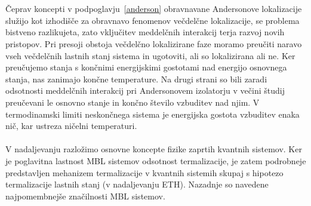 \\\\ 
Čeprav koncepti v podpoglavju~\ref{anderson} obravnavane Andersonove lokalizacije služijo kot izhodišče za obravnavo fenomenov večdelčne lokalizacije, se problema bistveno razlikujeta, zato vključitev meddelčnih interakcij terja razvoj novih pristopov.
 Pri presoji obstoja večdelčno lokalizirane faze moramo preučiti naravo vseh večdelčnih lastnih stanj sistema in ugotoviti, ali so lokalizirana ali ne. Ker preučujemo stanja s končnimi energijskimi gostotami nad energijo osnovnega stanja, nas zanimajo končne temperature. Na drugi strani so bili zaradi odsotnosti meddelčnih interakcij pri Andersonovem izolatorju v večini študij preučevani le osnovno stanje in končno število vzbuditev nad njim. V termodinamski limiti neskončnega sistema je energijska gostota vzbuditev enaka nič, kar ustreza ničelni temperaturi. 
\\\\
V nadaljevanju razložimo osnovne koncepte fizike zaprtih kvantnih sistemov. Ker je poglavitna lastnost MBL sistemov odsotnost termalizacije, je zatem podrobneje predstavljen mehanizem termalizacije v kvantnih sistemih skupaj s hipotezo termalizacije lastnih stanj (v nadaljevanju ETH). Nazadnje so navedene najpomembnejše značilnosti MBL sistemov. 
